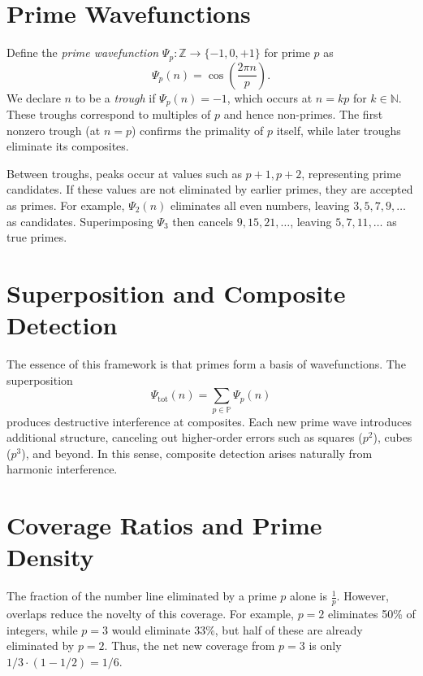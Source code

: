 \documentclass[reprint,amsmath,amssymb,aps,pra]{revtex4-2}
\newcommand{\Primes}{\mathbb{P}}              %
\newcommand{\N}{\mathbb{N}}                   %
\newcommand{\Z}{\mathbb{Z}}                   %
\newcommand{\W}{\Psi}                         %
\begin{document}
\section{Prime Wavefunctions}
Define the \emph{prime wavefunction} $\W_p: \Z \to \{-1,0,+1\}$ for prime $p$ as
\begin{equation}
\W_p(n) = \cos\left(\frac{2\pi n}{p}\right).
\end{equation}
We declare $n$ to be a \emph{trough} if $\W_p(n) = -1$, which occurs at $n = kp$ for $k \in \N$. These troughs correspond to multiples of $p$ and hence non-primes. The first nonzero trough (at $n = p$) confirms the primality of $p$ itself, while later troughs eliminate its composites.

Between troughs, peaks occur at values such as $p+1, p+2$, representing prime candidates. If these values are not eliminated by earlier primes, they are accepted as primes. For example, $\W_2(n)$ eliminates all even numbers, leaving $3,5,7,9,\dots$ as candidates. Superimposing $\W_3$ then cancels $9,15,21,\dots$, leaving $5,7,11,\dots$ as true primes.

\section{Superposition and Composite Detection}
The essence of this framework is that primes form a basis of wavefunctions. The superposition
\begin{equation}
\W_{\mathrm{tot}}(n) = \sum_{p \in \Primes} \W_p(n)
\end{equation}
produces destructive interference at composites. Each new prime wave introduces additional structure, canceling out higher-order errors such as squares ($p^2$), cubes ($p^3$), and beyond. In this sense, composite detection arises naturally from harmonic interference.

\section{Coverage Ratios and Prime Density}
The fraction of the number line eliminated by a prime $p$ alone is $\frac{1}{p}$. However, overlaps reduce the novelty of this coverage. For example, $p=2$ eliminates 50\% of integers, while $p=3$ would eliminate 33\%, but half of these are already eliminated by $p=2$. Thus, the net new coverage from $p=3$ is only $1/3 \cdot (1-1/2) = 1/6$.
\end{document}
